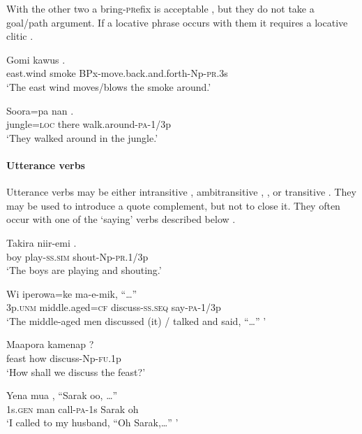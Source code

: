 With the other two a bring-\textsc{pr}efix is acceptable , but they do not take a goal/path argument. If a locative phrase occurs with them it requires a locative clitic .

\ea%
\label{ex:3:x293}
\gll Gomi kawus . \\
east.wind smoke BPx-move.back.and.forth-Np-\textsc{pr}.3s \\
\glt`The east wind moves/blows the smoke around.'
\z

\ea%
\label{ex:3:x436}
\gll Soora=pa nan . \\
jungle=\textsc{loc} there walk.around-\textsc{pa}-1/3p \\
\glt`They walked around in the jungle.'
\z

\paragraph{Utterance verbs}\label{sec:3:a:z:y:x}
{}
Utterance verbs may be either intransitive , ambitransitive , , or transitive . They may be used to introduce a quote complement, but not to close it. They often occur with one of the `saying' verbs described below .

\ea%
\label{ex:3:x309}
\gll Takira niir-emi . \\
boy play-\textsc{ss}.\textsc{sim} shout-Np-\textsc{pr}.1/3p \\
\glt`The boys are playing and shouting.'
\z

\ea%
\label{ex:3:x310}
\gll Wi iperowa=ke  ma-e-mik, ``{\dots}'' \\
3p.\textsc{unm} middle.aged=\textsc{cf} discuss-\textsc{ss}.\textsc{seq} say-\textsc{pa}-1/3p\\
\glt`The middle-aged men discussed (it) / talked and said, ``{\dots}'' '
\z

\ea%
\label{ex:3:x1927}
\gll Maapora kamenap ? \\
feast how discuss-Np-\textsc{fu}.1p\\
\glt`How shall we discuss the feast?'
\z

\ea%
\label{ex:3:x311}
\gll Yena mua , ``Sarak oo, {\dots}'' \\
1s.\textsc{gen} man call-\textsc{pa}-1s Sarak oh \\
\glt`I called to my husband, ``Oh Sarak,{\dots}'' '
\z

